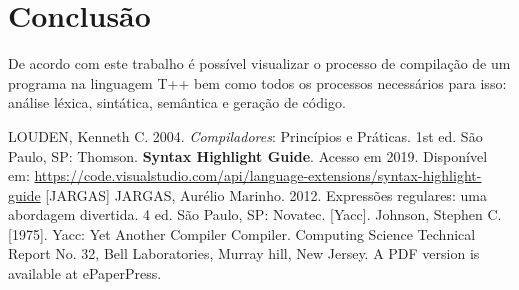 \documentclass[12pt]{article}
\begin{document}
\section{Conclusão} 
De acordo com este trabalho é possível visualizar o processo de compilação de um programa na linguagem T++ bem como todos os processos necessários para isso: análise léxica, sintática, semântica e geração de código.


\begin{thebibliography}{99} 
	LOUDEN, Kenneth C. 2004. \textit{Compiladores}: Princípios e Práticas. 1st ed.
	São Paulo, SP: Thomson. 
	\textbf{Syntax Highlight Guide}. Acesso em 2019. Disponível em: \url{
		https://code.visualstudio.com/api/language-extensions/syntax-highlight-guide} 
	[JARGAS] JARGAS, Aurélio Marinho. 2012. Expressões regulares: uma abordagem divertida. 4 ed. São
	Paulo, SP: Novatec.
	[Yacc]. Johnson, Stephen C. [1975]. Yacc: Yet Another Compiler
	Compiler. Computing Science Technical Report No. 32, Bell
	Laboratories, Murray hill, New Jersey. A PDF version is available at
	ePaperPress.  
\end{thebibliography}
\end{document}
